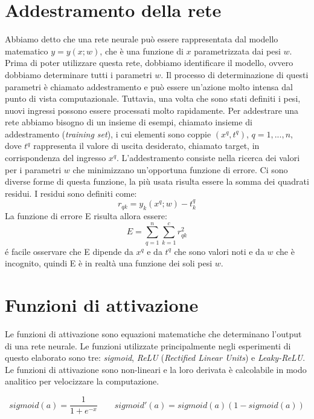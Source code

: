 \documentclass[11pt,a4paper,twoside,
openright]{book}
\begin{document}
\section{Addestramento della rete}
Abbiamo detto che una rete neurale può essere rappresentata dal modello matematico $y = y(x; w)$, che è una funzione di $x$ parametrizzata dai pesi $w$. Prima di poter utilizzare questa rete, dobbiamo identificare il modello, ovvero dobbiamo determinare tutti i parametri $w$. Il processo di determinazione di questi parametri è chiamato addestramento e può essere un’azione molto intensa dal punto di vista computazionale. Tuttavia, una volta che sono stati definiti i pesi, nuovi ingressi possono essere processati molto rapidamente.
Per addestrare una rete abbiamo bisogno di un insieme di esempi, chiamato insieme di addestramento (\textit{training set}), i cui elementi sono coppie $(x^{q}, t^{q})$, $q = 1, ..., n$, dove $t^{q}$ rappresenta il valore di uscita desiderato, chiamato target, in corrispondenza del ingresso $x^{q}$. 
L’addestramento consiste nella ricerca dei valori per i parametri $w$ che minimizzano un’opportuna funzione di errore. Ci sono diverse forme di questa funzione, la più usata risulta essere la somma dei quadrati residui. I residui sono definiti come:
\begin{equation}
r_{qk} = y_{k}\left(x^{q}; w\right) - t^{q}_{k}
\label{res}
\end{equation}
La funzione di errore E risulta allora essere:
\begin{equation}
E = \sum\limits_{q=1}^n \sum\limits_{k=1}^c r_{qk}^{2}
\label{quadres}
\end{equation}
é facile osservare che E dipende da $x^{q}$ e da $t^{q}$ che sono valori noti e da $w$ che è incognito, quindi E è in realtà una funzione dei soli pesi $w$.

\section{Funzioni di attivazione}
Le funzioni di attivazione sono equazioni matematiche che determinano l'output di una rete neurale.
Le funzioni utilizzate principalmente negli esperimenti di questo elaborato sono tre: \textit{sigmoid}, \textit{ReLU} (\textit{Rectified Linear Units}) e \textit{Leaky-ReLU}.
Le funzioni di attivazione sono non-lineari e la loro derivata è calcolabile in modo analitico per velocizzare la computazione.

\begin{equation}
sigmoid(a) = \frac{1}{1+e^{-x}} \qquad
sigmoid'(a) = sigmoid(a)(1-sigmoid(a))
\label{sigmoid}
\end{equation}
\end{document}
